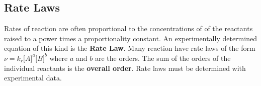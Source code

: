 \documentclass[a4paper, 12 pt]{article}
\newcommand{\conc}[1]{\lbrack #1 \rbrack}
\begin{document}
\begin{flushleft}
\section*{Rate Laws}

Rates of reaction are often proportional to the concentrations of of the reactants raised to a power times a proportionality constant. An experimentally determined equation of this kind is the \textbf{Rate Law}.
Many reaction have rate laws of the form $\nu = k_r \conc{A}^a \conc{B}^b$ where $a$ and $b$ are the orders. The sum of the orders of the individual reactants is the \textbf{overall order}. Rate laws must be determined with experimental data. 

\end{flushleft}
\end{document}
